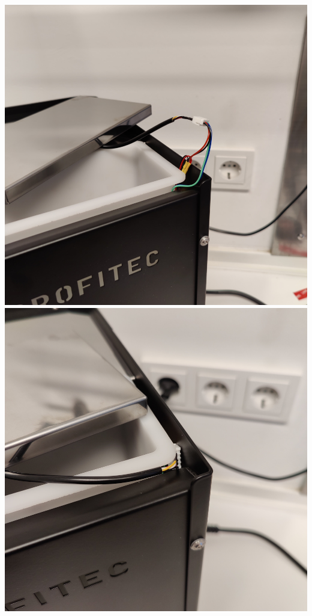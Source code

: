 \documentclass[]{article}
\begin{document}
\begin{minipage}[t]{0.4\linewidth}
	\includegraphics[width=\linewidth]{images/03_installation/22_connect_sensor.jpg}
	\includegraphics[width=\linewidth]{images/03_installation/23_hide_plug_refill_close_lid.jpg}
\end{minipage}
\end{document}
